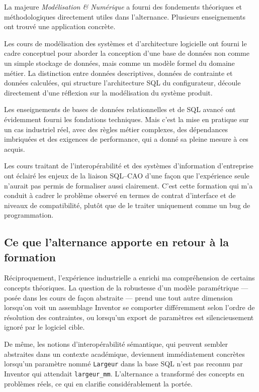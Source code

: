 La majeure \textit{Modélisation \& Numérique} a fourni des fondements théoriques et méthodologiques directement utiles dans l'alternance. Plusieurs enseignements ont trouvé une application concrète.

Les cours de modélisation des systèmes et d'architecture logicielle ont fourni le cadre conceptuel pour aborder la conception d'une base de données non comme un simple stockage de données, mais comme un modèle formel du domaine métier. La distinction entre données descriptives, données de contrainte et données calculées, qui structure l'architecture SQL du configurateur, découle directement d'une réflexion sur la modélisation du système produit.

Les enseignements de bases de données relationnelles et de SQL avancé ont évidemment fourni les fondations techniques. Mais c'est la mise en pratique sur un cas industriel réel, avec des règles métier complexes, des dépendances imbriquées et des exigences de performance, qui a donné sa pleine mesure à ces acquis.

Les cours traitant de l'interopérabilité et des systèmes d'information d'entreprise ont éclairé les enjeux de la liaison SQL--CAO d'une façon que l'expérience seule n'aurait pas permis de formaliser aussi clairement. C'est cette formation qui m'a conduit à cadrer le problème observé en termes de contrat d'interface et de niveaux de compatibilité, plutôt que de le traiter uniquement comme un bug de programmation.

\subsection{Ce que l'alternance apporte en retour à la formation}

Réciproquement, l'expérience industrielle a enrichi ma compréhension de certains concepts théoriques. La question de la robustesse d'un modèle paramétrique — posée dans les cours de façon abstraite — prend une tout autre dimension lorsqu'on voit un assemblage Inventor se comporter différemment selon l'ordre de résolution des contraintes, ou lorsqu'un export de paramètres est silencieusement ignoré par le logiciel cible.

De même, les notions d'interopérabilité sémantique, qui peuvent sembler abstraites dans un contexte académique, deviennent immédiatement concrètes lorsqu'un paramètre nommé \texttt{Largeur} dans la base SQL n'est pas reconnu par Inventor qui attendait \texttt{largeur\_mm}. L'alternance a transformé des concepts en problèmes réels, ce qui en clarifie considérablement la portée.


